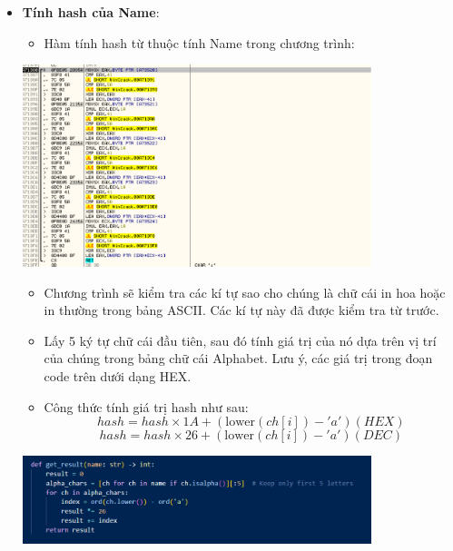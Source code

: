 \begin{itemize}
    \item \textbf{Tính hash của Name}:
        \begin{itemize}
        \item Hàm tính hash từ thuộc tính Name trong chương trình:
    \end{itemize}
        \begin{center}
        \includegraphics[width=0.8\textwidth]{img/file-2/asm11.PNG}
    \end{center}
    \begin{itemize}
        \item Chương trình sẽ kiểm tra các kí tự sao cho chúng là chữ cái in hoa hoặc in thường trong bảng ASCII. Các kí tự này đã được kiểm tra từ trước.
        \item Lấy 5 ký tự chữ cái đầu tiên, sau đó tính giá trị của nó dựa trên vị trí của chúng trong bảng chữ cái Alphabet. Lưu ý, các giá trị trong đoạn code trên dưới dạng HEX.
        \item Công thức tính giá trị hash như sau:
        \[
        hash = hash \times 1A + (\text{lower}(ch[i]) - 'a')(HEX)
        \]
        \[
        hash = hash \times 26 + (\text{lower}(ch[i]) - 'a')(DEC)
        \]
    \end{itemize}
    \begin{center}
        \includegraphics[width=0.8\textwidth]{img/file-2/code1.PNG}
    \end{center}
    

\end{itemize}
